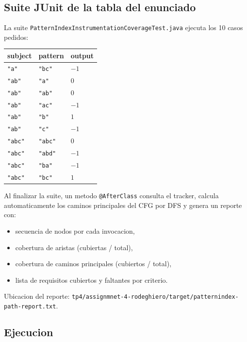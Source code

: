\documentclass[12pt,a4paper]{article}
\begin{document}
\subsection{Suite JUnit de la tabla del enunciado}

La suite \texttt{PatternIndexInstrumentationCoverageTest.java} ejecuta los 10 casos pedidos:

\begin{longtable}{@{}p{2cm}p{2cm}p{1.5cm}@{}}
\toprule
\textbf{subject} & \textbf{pattern} & \textbf{output} \\
\midrule
\endhead
\texttt{"a"} & \texttt{"bc"} & $-1$ \\
\texttt{"ab"} & \texttt{"a"} & $0$ \\
\texttt{"ab"} & \texttt{"ab"} & $0$ \\
\texttt{"ab"} & \texttt{"ac"} & $-1$ \\
\texttt{"ab"} & \texttt{"b"} & $1$ \\
\texttt{"ab"} & \texttt{"c"} & $-1$ \\
\texttt{"abc"} & \texttt{"abc"} & $0$ \\
\texttt{"abc"} & \texttt{"abd"} & $-1$ \\
\texttt{"abc"} & \texttt{"ba"} & $-1$ \\
\texttt{"abc"} & \texttt{"bc"} & $1$ \\
\bottomrule
\end{longtable}

Al finalizar la suite, un metodo \texttt{@AfterClass} consulta el tracker, calcula automaticamente
los caminos principales del CFG por DFS y genera un reporte con:

\begin{itemize}
  \item secuencia de nodos por cada invocacion,
  \item cobertura de aristas (cubiertas / total),
  \item cobertura de caminos principales (cubiertos / total),
  \item lista de requisitos cubiertos y faltantes por criterio.
\end{itemize}

Ubicacion del reporte: \texttt{tp4/assignmnet-4-rodeghiero/target/patternindex-path-report.txt}.

\subsection{Ejecucion}
\end{document}
